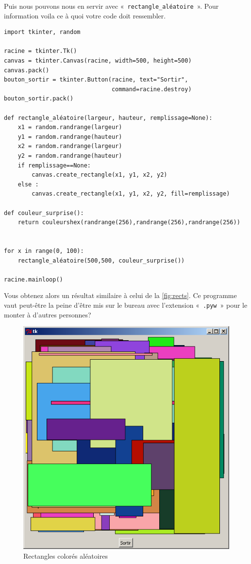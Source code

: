 Puis nous pouvons nous en servir avec «~\texttt{rectangle\_aléatoire}~». Pour information voila ce à quoi votre code doit ressembler.

\begin{Verbatim}[frame=single,rulecolor=\color{mbleu}, label=à taper]
import tkinter, random

racine = tkinter.Tk()
canvas = tkinter.Canvas(racine, width=500, height=500)
canvas.pack()
bouton_sortir = tkinter.Button(racine, text="Sortir",
                               command=racine.destroy)
bouton_sortir.pack()

def rectangle_aléatoire(largeur, hauteur, remplissage=None):
    x1 = random.randrange(largeur)
    y1 = random.randrange(hauteur)
    x2 = random.randrange(largeur)
    y2 = random.randrange(hauteur)
    if remplissage==None:
        canvas.create_rectangle(x1, y1, x2, y2)
    else :	
        canvas.create_rectangle(x1, y1, x2, y2, fill=remplissage)

def couleur_surprise():
    return couleurshex(randrange(256),randrange(256),randrange(256))


for x in range(0, 100):
    rectangle_aléatoire(500,500, couleur_surprise())

racine.mainloop()
\end{Verbatim}

Vous obtenez alors un résultat similaire à celui de la \autoref{fig:rects}. Ce programme vaut peut-être la peine d'être mis sur le bureau avec l'extension «~\texttt{.pyw}~» pour le monter à d'autres personnes?
\begin{figure}[h!]
\centering
\includegraphics[scale=0.4]{images/rectangles2}
\caption{Rectangles colorés aléatoires}\label{fig:rects}
\end{figure}

